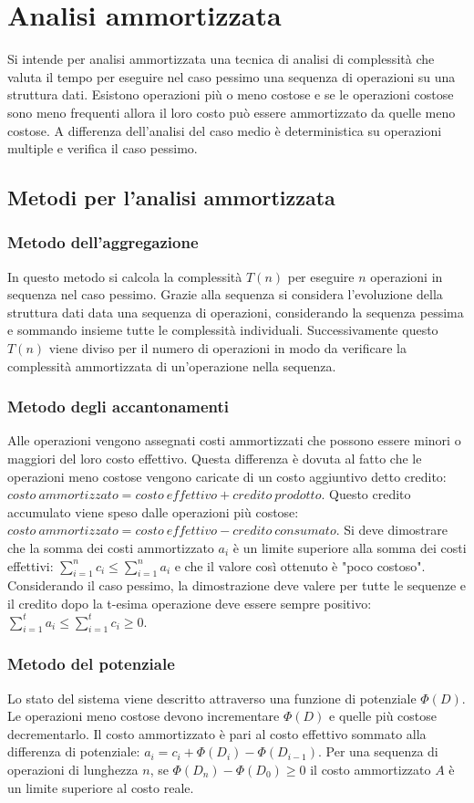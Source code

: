\section{Analisi ammortizzata}
Si intende per analisi ammortizzata una tecnica di analisi di complessit\`a che valuta il tempo per eseguire nel caso pessimo una sequenza di operazioni 
su una struttura dati. Esistono operazioni pi\`u o meno costose e se le operazioni costose sono meno frequenti allora il loro costo pu\`o essere 
ammortizzato da quelle meno costose. A differenza dell'analisi del caso medio \`e deterministica su operazioni multiple e verifica il caso pessimo.
\subsection{Metodi per l'analisi ammortizzata}
\subsubsection{Metodo dell'aggregazione}
In questo metodo si calcola la complessit\`a $T(n)$ per eseguire $n$ operazioni in sequenza nel caso pessimo. Grazie alla sequenza si considera l'evoluzione
della struttura dati data una sequenza di operazioni, considerando la sequenza pessima e sommando insieme tutte le complessit\`a individuali. 
Successivamente questo $T(n)$ viene diviso per il numero di operazioni in modo da verificare la complessit\`a ammortizzata di un'operazione nella sequenza.
\subsubsection{Metodo degli accantonamenti}
Alle operazioni vengono assegnati costi ammortizzati che possono essere minori o maggiori del loro costo effettivo. Questa differenza \`e dovuta al fatto
che le operazioni meno costose vengono caricate di un costo aggiuntivo detto credito: $costo\ ammortizzato=costo\ effettivo+credito\ prodotto$. Questo 
credito accumulato viene speso dalle operazioni pi\`u costose: $costo\ ammortizzato=costo\ effettivo-credito\ consumato$. Si deve dimostrare che la somma
dei costi ammortizzato $a_i$ \`e un limite superiore alla somma dei costi effettivi: $\sum\limits_{i=1}^nc_i\le\sum\limits_{i=1}^na_i$ e che il valore 
cos\`i ottenuto \`e "poco costoso". Considerando il caso pessimo, la dimostrazione deve valere per tutte le sequenze e il credito dopo la t-esima operazione
deve essere sempre positivo: $\sum\limits_{i=1}^ta_i\le\sum\limits_{i=1}^tc_i\ge 0$.
\subsubsection{Metodo del potenziale}
Lo stato del sistema viene descritto attraverso una funzione di potenziale $\Phi(D)$. Le operazioni meno costose devono incrementare $\Phi(D)$ e quelle
pi\`u costose decrementarlo. Il costo ammortizzato \`e pari al costo effettivo sommato alla differenza di potenziale: $a_i=c_i+\Phi(D_i)-\Phi(D_{i-1})$.
Per una sequenza di operazioni di lunghezza $n$, se $\Phi(D_n)-\Phi(D_0)\ge 0$ il costo ammortizzato $A$ \`e un limite superiore al costo reale.
